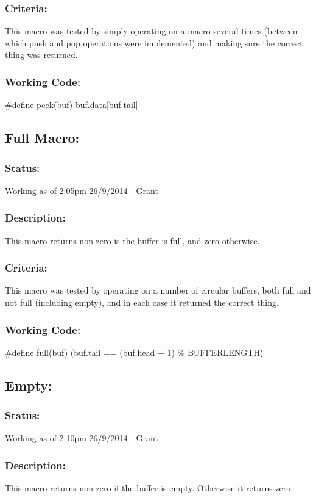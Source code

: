 \documentclass[]{article}
\begin{document}
\subsubsection{Criteria:}
This macro was tested by simply operating on a macro several times (between which push and pop operations were implemented) and making sure the correct thing was returned.

\subsubsection{Working Code:}
\#define peek(buf) buf.data[buf.tail]

\subsection{Full Macro:}
\subsubsection{Status:}
Working as of 2:05pm 26/9/2014 - Grant

\subsubsection{Description:}
This macro returns non-zero is the buffer is full, and zero otherwise.

\subsubsection{Criteria:}
This macro was tested by operating on a number of circular buffers, both full and not full (including empty), and in each case it returned the correct thing.

\subsubsection{Working Code:}
\#define full(buf) (buf.tail == (buf.head + 1) \% BUFFERLENGTH)

\subsection{Empty:}
\subsubsection{Status:}
Working as of 2:10pm 26/9/2014 - Grant

\subsubsection{Description:}
This macro returns non-zero if the buffer is empty. Otherwise it returns zero.
\end{document}
